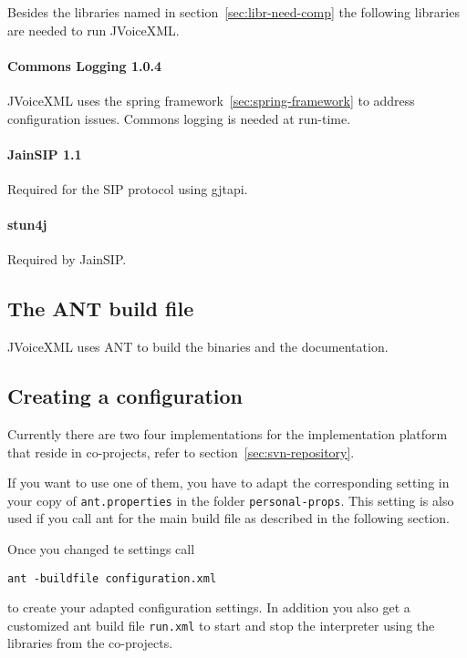 \documentclass[11pt,a4paper]{article}
\begin{document}
Besides the libraries named in section~\ref{sec:libr-need-comp} the following
libraries are needed to run JVoiceXML.

\paragraph{Commons Logging 1.0.4}
\label{sec:commons-logging}

JVoiceXML uses the spring framework~\ref{sec:spring-framework} to address 
configuration
issues. Commons logging is needed at run-time.

\paragraph{JainSIP 1.1}

Required for the SIP protocol using gjtapi.

\paragraph{stun4j}

Required by JainSIP.

\subsection{The ANT build file}
\label{sec:ant-build-file}

JVoiceXML uses ANT to build the binaries and the documentation. 

\subsection{Creating a configuration}

Currently there are two four implementations for the implementation platform
that reside in co-projects, refer to section~\ref{sec:svn-repository}.

If you want to use one of them, you have to adapt the corresponding setting
in your copy of \texttt{ant.properties} in the folder \texttt{personal-props}.
This setting is also used if you call ant for the main build file as described
in the following section.

Once you changed te settings call
\begin{lstlisting}
ant -buildfile configuration.xml
\end{lstlisting}
to create your adapted configuration settings. In addition you also get
a customized ant build file \texttt{run.xml} to start and stop the interpreter
using the libraries from the co-projects.
\end{document}
